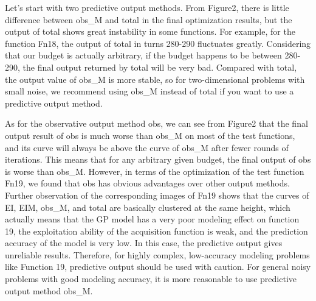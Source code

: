 \documentclass{article}
\begin{document}
\hspace{2em}Let's start with two predictive output methods. From Figure2, there is little difference between obs\_M and total in the final optimization results, but the output of total shows great instability in some functions. For example, for the function Fn18, the output of total in turns 280-290 fluctuates greatly. Considering that our budget is actually arbitrary, if the budget happens to be between 280-290, the final output returned by total will be very bad. Compared with total, the output value of obs\_M is more stable, so for two-dimensional problems with small noise, we recommend using obs\_M instead of total if you want to use a predictive output method.

\hspace{2em}As for the observative output method obs, we can see from Figure2 that the final output result of obs is much worse than obs\_M on most of the test functions, and its curve will always be above the curve of obs\_M after fewer rounds of iterations. This means that for any arbitrary given budget, the final output of obs is worse than obs\_M. However, in terms of the optimization of the test function Fn19, we found that obs has obvious advantages over other output methods. Further observation of the corresponding images of Fn19 shows that the curves of EI, EIM, obs\_M, and total are basically clustered at the same height, which actually means that the GP model has a very poor modeling effect on function 19, the exploitation ability of the acquisition function is weak, and the prediction accuracy of the model is very low. In this case, the predictive output gives unreliable results. Therefore, for highly complex, low-accuracy modeling problems like Function 19, predictive output should be used with caution. For general noisy problems with good modeling accuracy, it is more reasonable to use predictive output method obs\_M.
\end{document}
